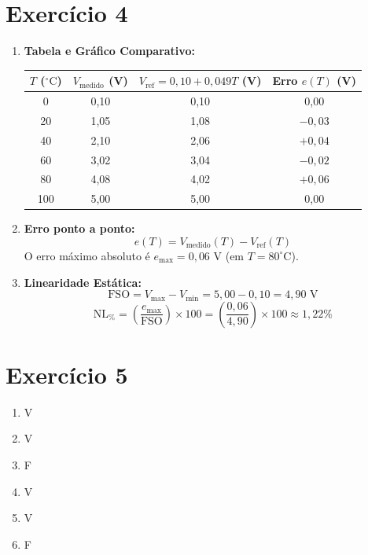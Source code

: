 \section*{Exercício 4}

\begin{enumerate}
    \item[\textbf{a)}] \textbf{Tabela e Gráfico Comparativo:}
    
    \begin{table}[h!]
        \centering
        \begin{tabular}{cccc}
            \toprule
            $T$ ($^\circ\text{C}$) & $V_{\text{medido}}$ (V) & $V_{\text{ref}} = 0{,}10 + 0{,}049T$ (V) & Erro $e(T)$ (V) \\
            \midrule
            0   & 0{,}10 & 0{,}10 & 0{,}00 \\
            20  & 1{,}05 & 1{,}08 & $-0{,}03$ \\
            40  & 2{,}10 & 2{,}06 & $+0{,}04$ \\
            60  & 3{,}02 & 3{,}04 & $-0{,}02$ \\
            80  & 4{,}08 & 4{,}02 & $+0{,}06$ \\
            100 & 5{,}00 & 5{,}00 & 0{,}00 \\
            \bottomrule
        \end{tabular}
    \end{table}

    \item[\textbf{b)}] \textbf{Erro ponto a ponto:}
    \[
    e(T) = V_{\text{medido}}(T) - V_{\text{ref}}(T)
    \]
    O erro máximo absoluto é $e_{\max} = 0{,}06\text{ V}$ (em $T = 80^\circ\text{C}$).

    \item[\textbf{c)}] \textbf{Linearidade Estática:}
    \[
    \text{FSO} = V_{\max} - V_{\min} = 5{,}00 - 0{,}10 = 4{,}90\text{ V}
    \]
    \[
    \text{NL}_{\%} = \left(\frac{e_{\max}}{\text{FSO}}\right) \times 100 = \left(\frac{0{,}06}{4{,}90}\right) \times 100 \approx 1{,}22\%
    \]
\end{enumerate}
\section*{Exercício 5}

\begin{enumerate}
    \item[\textbf{a)}] V
    \item[\textbf{b)}] V
    \item[\textbf{c)}] F
    \item[\textbf{d)}] V
    \item[\textbf{e)}] V
    \item[\textbf{f)}] F

\end{enumerate}

